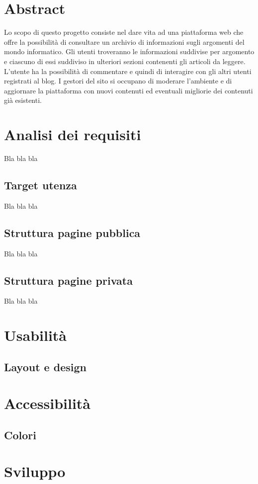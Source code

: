 \documentclass[12pt]{article}
\begin{document}
	

	\section*{Abstract}
	Lo scopo di questo progetto consiste nel dare vita ad una piattaforma web che offre la possibilità di consultare un archivio di informazioni sugli argomenti del mondo informatico. Gli utenti troveranno le informazioni suddivise per argomento e ciascuno di essi suddiviso in ulteriori sezioni contenenti gli articoli da leggere. L'utente ha la possibilità di commentare e quindi di interagire con gli altri utenti registrati al blog. I gestori del sito si occupano di moderare l'ambiente e di aggiornare la piattaforma con nuovi contenuti ed eventuali migliorie dei contenuti già esistenti.

	\section{Analisi dei requisiti}
	Bla bla bla
	\subsection{Target utenza}
	Bla bla bla
	\subsection{Struttura pagine pubblica}
	Bla bla bla
	\subsection{Struttura pagine privata}
	Bla bla bla

	\section{Usabilità}
	\subsection{Layout e design}

	\section{Accessibilità}
	\subsection{Colori}

	\section{Sviluppo}
\end{document}
